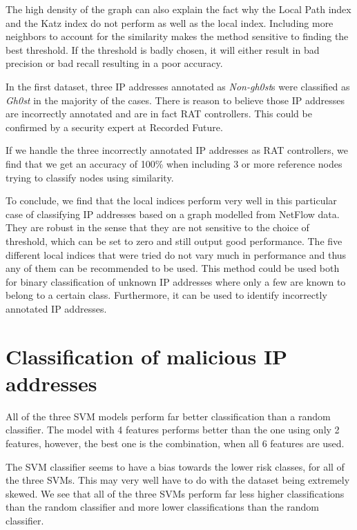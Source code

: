 The high density of the graph can also explain the fact why the Local Path index and the Katz index do not perform as well as the local index. Including more neighbors to account for the similarity makes the method sensitive to finding the best threshold. If the threshold is badly chosen, it will either result in bad precision or bad recall resulting in a poor accuracy.

In the first dataset, three IP addresses annotated as \textit{Non-gh0st}s were classified as \textit{Gh0st} in the majority of the cases. There is reason to believe those IP addresses are incorrectly annotated and are in fact RAT controllers. This could be confirmed by a security expert at Recorded Future.

If we handle the three incorrectly annotated IP addresses as RAT controllers, we find that we get an accuracy of 100\% when including 3 or more reference nodes trying to classify nodes using similarity. 

To conclude, we find that the local indices perform very well in this particular case of classifying IP addresses based on a graph modelled from NetFlow data. They are robust in the sense that they are not sensitive to the choice of threshold, which can be set to zero and still output good performance. The five different local indices that were tried do not vary much in performance and thus any of them can be recommended to be used. This method could be used both for binary classification of unknown IP addresses where only a few are known to belong to a certain class. Furthermore, it can be used to identify incorrectly annotated IP addresses. 

\section{Classification of malicious IP addresses}
All of the three SVM models perform far better classification than a random classifier. The model with 4 features performs better than the one using only 2 features, however, the best one is the combination, when all 6 features are used. 

The SVM classifier seems to have a bias towards the lower risk classes, for all of the three SVMs. This may very well have to do with the dataset being extremely skewed. We see that all of the three SVMs perform far less higher classifications than the random classifier and more lower classifications than the random classifier.

